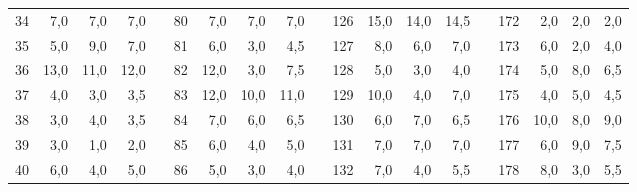 \begin{table}[H]
{\begin{tabular}{|r|r|r|r|l|r|r|r|r|l|r|r|r|r|lrrrr}
34                               & 7,0                          & 7,0                          & 7,0                          &  & 80 & 7,0  & 7,0  & 7,0  &  & 126 & 15,0 & 14,0 & 14,5 & \multicolumn{1}{l|}{} & \multicolumn{1}{r|}{172} & \multicolumn{1}{r|}{2,0}  & \multicolumn{1}{r|}{2,0}  & \multicolumn{1}{r|}{2,0}  \\ \cline{1-4} \cline{6-9} \cline{11-14} \cline{16-19} 
35                               & 5,0                          & 9,0                          & 7,0                          &  & 81 & 6,0  & 3,0  & 4,5  &  & 127 & 8,0  & 6,0  & 7,0  & \multicolumn{1}{l|}{} & \multicolumn{1}{r|}{173} & \multicolumn{1}{r|}{6,0}  & \multicolumn{1}{r|}{2,0}  & \multicolumn{1}{r|}{4,0}  \\ \cline{1-4} \cline{6-9} \cline{11-14} \cline{16-19} 
36                               & 13,0                         & 11,0                         & 12,0                         &  & 82 & 12,0 & 3,0  & 7,5  &  & 128 & 5,0  & 3,0  & 4,0  & \multicolumn{1}{l|}{} & \multicolumn{1}{r|}{174} & \multicolumn{1}{r|}{5,0}  & \multicolumn{1}{r|}{8,0}  & \multicolumn{1}{r|}{6,5}  \\ \cline{1-4} \cline{6-9} \cline{11-14} \cline{16-19} 
37                               & 4,0                          & 3,0                          & 3,5                          &  & 83 & 12,0 & 10,0 & 11,0 &  & 129 & 10,0 & 4,0  & 7,0  & \multicolumn{1}{l|}{} & \multicolumn{1}{r|}{175} & \multicolumn{1}{r|}{4,0}  & \multicolumn{1}{r|}{5,0}  & \multicolumn{1}{r|}{4,5}  \\ \cline{1-4} \cline{6-9} \cline{11-14} \cline{16-19} 
38                               & 3,0                          & 4,0                          & 3,5                          &  & 84 & 7,0  & 6,0  & 6,5  &  & 130 & 6,0  & 7,0  & 6,5  & \multicolumn{1}{l|}{} & \multicolumn{1}{r|}{176} & \multicolumn{1}{r|}{10,0} & \multicolumn{1}{r|}{8,0}  & \multicolumn{1}{r|}{9,0}  \\ \cline{1-4} \cline{6-9} \cline{11-14} \cline{16-19} 
39                               & 3,0                          & 1,0                          & 2,0                          &  & 85 & 6,0  & 4,0  & 5,0  &  & 131 & 7,0  & 7,0  & 7,0  & \multicolumn{1}{l|}{} & \multicolumn{1}{r|}{177} & \multicolumn{1}{r|}{6,0}  & \multicolumn{1}{r|}{9,0}  & \multicolumn{1}{r|}{7,5}  \\ \cline{1-4} \cline{6-9} \cline{11-14} \cline{16-19} 
40                               & 6,0                          & 4,0                          & 5,0                          &  & 86 & 5,0  & 3,0  & 4,0  &  & 132 & 7,0  & 4,0  & 5,5  & \multicolumn{1}{l|}{} & \multicolumn{1}{r|}{178} & \multicolumn{1}{r|}{8,0}  & \multicolumn{1}{r|}{3,0}  & \multicolumn{1}{r|}{5,5}  \\ \cline{1-4} \cline{6-9} \cline{11-14} \cline{16-19} 

\end{tabular}}
\end{table}
